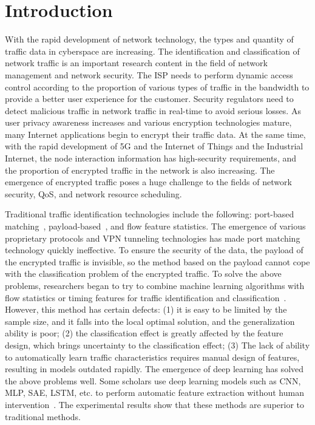 \documentclass[conference]{IEEEtran}
\begin{document}
\section{Introduction}
With the rapid development of network technology, the types and quantity of traffic data in cyberspace are increasing. The identification and classification of network traffic is an important research content in the field of network management and network security. The ISP needs to perform dynamic access control according to the proportion of various types of traffic in the bandwidth to provide a better user experience for the customer. Security regulators need to detect malicious traffic in network traffic in real-time to avoid serious losses. As user privacy awareness increases and various encryption technologies mature, many Internet applications begin to encrypt their traffic data. At the same time, with the rapid development of 5G and the Internet of Things and the Industrial Internet, the node interaction information has high-security requirements, and the proportion of encrypted traffic in the network is also increasing. The emergence of encrypted traffic poses a huge challenge to the fields of network security, QoS, and network resource scheduling.

Traditional traffic identification technologies include the following: port-based matching~\cite{r1}, payload-based~\cite{r2}, and flow feature statistics. The emergence of various proprietary protocols and VPN tunneling technologies has made port matching technology quickly ineffective. To ensure the security of the data, the payload of the encrypted traffic is invisible, so the method based on the payload cannot cope with the classification problem of the encrypted traffic. To solve the above problems, researchers began to try to combine machine learning algorithms with flow statistics or timing features for traffic identification and classification~\cite{r3,r4,r5,r6}. However, this method has certain defects: (1) it is easy to be limited by the sample size, and it falls into the local optimal solution, and the generalization ability is poor; (2) the classification effect is greatly affected by the feature design, which brings uncertainty to the classification effect; (3) The lack of ability to automatically learn traffic characteristics requires manual design of features, resulting in models outdated rapidly. The emergence of deep learning has solved the above problems well. Some scholars use deep learning models such as CNN, MLP, SAE, LSTM, etc. to perform automatic feature extraction without human intervention~\cite{r7,r8,r9,r10}. The experimental results show that these methods are superior to traditional methods.
\end{document}
